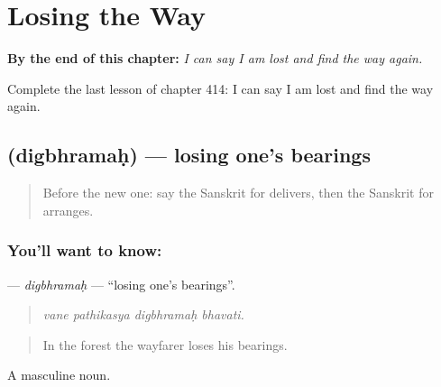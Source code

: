 
\chapter{Losing the Way}
\label{ch:sa-losing-the-way}

\begin{chapteropening}
\textbf{By the end of this chapter:} \emph{I can say I am lost and find the way again.}

Complete the last lesson of chapter 414: I can say I am lost and find the way again.
\end{chapteropening}

\section[\texorpdfstring{\sk{दिग्भ्रमः} (digbhramaḥ)}{दिग्भ्रमः (digbhramaḥ)}]{ (digbhramaḥ) — losing one's bearings}

\label{lesson:SA-C414-digbhramah}



\begin{quote}
Before the new one: say the Sanskrit for delivers, then the Sanskrit for arranges.
\end{quote}

\subsection*{You'll want to know: }
\textbf{} — \emph{digbhramaḥ} — \textquotedblleft{}losing one's bearings\textquotedblright{}.

\begin{quote}
   
\end{quote}

\begin{quote}
\emph{vane pathikasya digbhramaḥ bhavati.}
\end{quote}

\begin{quote}
In the forest the wayfarer loses his bearings.
\end{quote}

A masculine noun.

